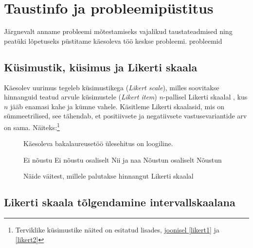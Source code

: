 \documentclass[a4paper,12pt,oneside]{article}
\numberwithin{equation}{section}
\theoremstyle{definition}
\begin{document}
\section{Taustinfo ja probleemipüstitus}

Järgnevalt anname probleemi mõtestamiseks vajalikud taustateadmised ning pea\-tüki lõpetuseks püstitame käesoleva töö keskse probleemi. {\color{red} probleemid}

\subsection{Küsimustik, küsimus ja Likerti skaala}

Käesolev uurimus tegeleb k\"usimustikega (\textit{Likert scale}),  milles soovitakse hinnan\-guid teatud arvule küsimustele (\textit{Likert item}) $n$-pallisel Likerti skaalal \cite{Edmondson}, kus $n$ jääb enamasi kahe ja kümne vahele.  Käsitleme Likerti skaalasid, mis on sümmeetrilised, see tähendab, et positiivsete ja negatiivsete vastusevariantide arv on sama. Näiteks:\footnote{Terviklike k\"usimustike näited on esitatud lisades, \hyperref[likert1]{joonisel \ref*{likert1}} ja \hyperref[likert2]{\ref*{likert2}}}

\vspace{10pt}

\begin{figure}[H]


\colorbox{background_example}{\parbox{\textwidth}{

\vspace{1mm}

Käesoleva bakalaureusetöö \"ulesehitus on loogiline.

\vspace{5pt}

\begin{Form}
\def\DefaultWidthofChoiceMenu{12pt}%


\small{
	\CheckBox[bordercolor = gray,name=optionE]{\mbox{}} Ei nõustu 
	\CheckBox[bordercolor = gray,name=optionD]{\mbox{}} Ei nõustu osaliselt
	\CheckBox[bordercolor = gray,name=optionC]{\mbox{}} Nii ja naa
	\CheckBox[bordercolor = gray,name=optionC]{\mbox{}}  Nõustun osaliselt
	\CheckBox[checked,bordercolor = gray,name=optionC]{\mbox{}} Nõustun
}


\end{Form}}}
\caption{Näide väitest, millele palutakse hinnangut Likerti skaalal}
\label{likert_question}
\end{figure}

\subsection{Likerti skaala tõlgendamine intervallskaalana}
\end{document}

